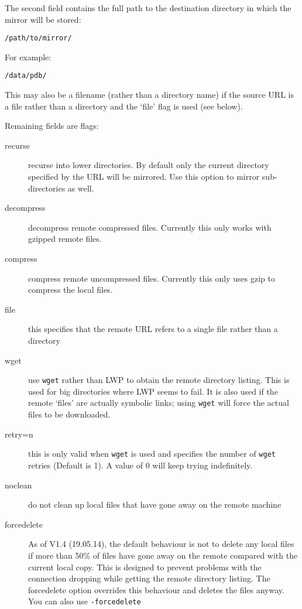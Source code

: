 \documentclass{article}
\begin{document}
The second field contains the full path to the destination directory
in which the mirror will be stored:
\begin{verbatim}
/path/to/mirror/
\end{verbatim}
For example:
\begin{verbatim}
/data/pdb/
\end{verbatim}
This may also be a filename (rather than a directory name) if the
source URL is a file rather than a directory and the `file' flag is
used (see below).

Remaining fields are flags:
\begin{description}
\item[recurse]    recurse into lower directories. By default only the
  current directory specified by the URL will be mirrored. Use this
  option to mirror sub-directories as well.
\item[decompress] decompress remote compressed files. Currently this
  only works with gzipped remote files.
\item[compress]   compress remote uncompressed files. Currently this
  only uses gzip to compress the local files.
\item[file]       this specifies that the remote URL refers to a
  single file rather than a directory
\item[wget]       use \verb|wget| rather than LWP to obtain the remote
  directory listing. This is used for big directories where LWP seems
  to fail. It is also used if the remote `files' are actually symbolic
  links; using \verb|wget| will force the actual files to be downloaded.
\item[retry=n]    this is only valid when \verb|wget| is used and specifies
                  the number of \verb|wget| retries (Default is 1).
                  A value of 0 will keep trying indefinitely.
\item[noclean]    do not clean up local files that have gone away on the
                  remote machine
\item[forcedelete] As of V1.4 (19.05.14), the default behaviour is not
                   to delete any local files if more than 50\% of
                   files have gone away on the remote compared with
                   the current local copy. This is designed to prevent
                   problems with the connection dropping while getting
                   the remote directory listing. The forcedelete
                   option overrides this behaviour and deletes the
                   files anyway. You can also use \verb|-forcedelete|

\end{description}
\end{document}
